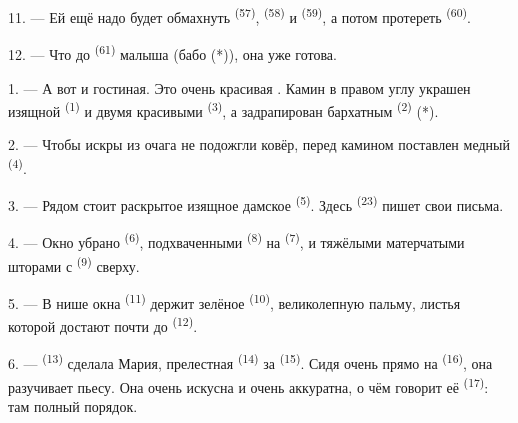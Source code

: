 

11. --- Ей ещё надо будет обмахнуть  \textsuperscript{(57)},
 \textsuperscript{(58)} и 
\textsuperscript{(59)}, а потом протереть  \textsuperscript{(60)}.

12. --- Что до  \textsuperscript{(61)} малыша (бабо (*)), она
уже готова.

\VUsaut{5.0mm}
\VUsaut{3.0mm}

1. --- А вот и гостиная. Это очень красивая . Камин в
правом углу украшен изящной  \textsuperscript{(1)} и двумя
красивыми  \textsuperscript{(3)}, а задрапирован бархатным
 \textsuperscript{(2)} (*).

2. --- Чтобы искры из очага не подожгли ковёр, перед камином поставлен
медный  \textsuperscript{(4)}.

3. --- Рядом стоит раскрытое изящное дамское  \textsuperscript{(5)}.
Здесь  \textsuperscript{(23)} пишет свои письма.

4. --- Окно убрано  \textsuperscript{(6)},
подхваченными  \textsuperscript{(8)} на 
\textsuperscript{(7)}, и тяжёлыми матерчатыми шторами с 
\textsuperscript{(9)} сверху.

5. --- В нише окна  \textsuperscript{(11)} держит зелёное
 \textsuperscript{(10)}, великолепную пальму, листья которой
достают почти до  \textsuperscript{(12)}.

6. ---  \textsuperscript{(13)} сделала Мария, прелестная
 \textsuperscript{(14)} за  \textsuperscript{(15)}.
Сидя очень прямо на  \textsuperscript{(16)}, она разучивает
пьесу. Она очень искусна и очень аккуратна, о чём говорит её
 \textsuperscript{(17)}: там полный порядок.

